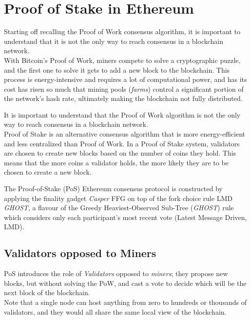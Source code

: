 \chapter{Proof of Stake in Ethereum}

Starting off recalling the Proof of Work consensus algorithm, it is important to understand that it is not the only way to reach consensus in a blockchain network.\\
With Bitcoin's Proof of Work, miners compete to solve a cryptographic puzzle, and the first one to solve it gets to add a new block to the blockchain. This process is energy-intensive and requires a lot of computational power, and has its cost has risen so much that mining pools (\textit{farms}) control a significant portion of the network's hash rate, ultimately making the blockchain not fully distributed.

It is important to understand that the Proof of Work algorithm is not the only way to reach consensus in a blockchain network.\\
Proof of Stake is an alternative consensus algorithm that is more energy-efficient and less centralized than Proof of Work. In a Proof of Stake system, validators are chosen to create new blocks based on the number of coins they hold. This means that the more coins a validator holds, the more likely they are to be chosen to create a new block.

\begin{definition}
   The Proof-of-Stake (PoS) Ethereum consensus protocol is constructed by applying the finality gadget \textit{Casper} FFG on top of the fork choice rule LMD \textit{GHOST}, a flavour of the Greedy Heaviest-Observed Sub-Tree (\textit{GHOST}) rule which considers only each participant's most recent vote (Latest
   Message Driven, LMD).
\end{definition}
\section{Validators opposed to Miners}

PoS introduces the role of \textit{Validators} opposed to \textit{miners}; they propose new blocks, but without solving the PoW, and cast a vote to decide which will be the next block of the blockchain.\\
Note that a single node can host anything from zero to hundreds or thousands of validators, and they would all share the same local view of the blockchain. 



